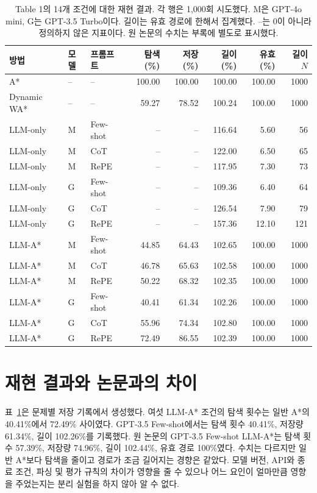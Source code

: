 \documentclass[11pt]{article}
\begin{document}
\begin{table}[t]
\centering\small
\begin{tabular}{lllrrrrr}
\toprule
방법 & 모델 & 프롬프트 & 탐색(\%) & 저장(\%) & 길이(\%) & 유효(\%) & 길이 $N$\\
\midrule
A* & -- & -- & 100.00 & 100.00 & 100.00 & 100.00 & 1000 \\
Dynamic WA* & -- & -- & 59.27 & 78.52 & 100.24 & 100.00 & 1000 \\
LLM-only & M & Few-shot & -- & -- & 116.64 & 5.60 & 56 \\
LLM-only & M & CoT & -- & -- & 122.00 & 6.50 & 65 \\
LLM-only & M & RePE & -- & -- & 117.95 & 7.30 & 73 \\
LLM-only & G & Few-shot & -- & -- & 109.36 & 6.40 & 64 \\
LLM-only & G & CoT & -- & -- & 126.54 & 7.90 & 79 \\
LLM-only & G & RePE & -- & -- & 157.36 & 12.10 & 121 \\
LLM-A* & M & Few-shot & 44.85 & 64.43 & 102.65 & 100.00 & 1000 \\
LLM-A* & M & CoT & 46.78 & 65.63 & 102.58 & 100.00 & 1000 \\
LLM-A* & M & RePE & 50.22 & 68.32 & 102.35 & 100.00 & 1000 \\
LLM-A* & G & Few-shot & 40.41 & 61.34 & 102.26 & 100.00 & 1000 \\
LLM-A* & G & CoT & 55.96 & 74.34 & 102.80 & 100.00 & 1000 \\
LLM-A* & G & RePE & 72.49 & 86.55 & 102.39 & 100.00 & 1000 \\
\bottomrule
\end{tabular}
\caption{Table 1의 14개 조건에 대한 재현 결과. 각 행은 1,000회 시도했다. M은 GPT-4o mini, G는 GPT-3.5 Turbo이다. 길이는 유효 경로에 한해서 집계했다. --는 0이 아니라 정의하지 않은 지표이다. 원 논문의 수치는 부록에 별도로 표시했다.}
\label{tab:reproduction}
\end{table}

\section{재현 결과와 논문과의 차이}
표~\ref{tab:reproduction}은 문제별 저장 기록에서 생성했다. 여섯 LLM-A* 조건의 탐색 횟수는 일반 A*의 40.41\%에서 72.49\% 사이였다. GPT-3.5 Few-shot에서는 탐색 횟수 40.41\%, 저장량 61.34\%, 길이 102.26\%를 기록했다. 원 논문의 GPT-3.5 Few-shot LLM-A*는 탐색 횟수 57.39\%, 저장량 74.96\%, 길이 102.44\%, 유효 경로 100\%였다. 수치는 다르지만 일반 A*보다 탐색을 줄이고 경로가 조금 길어지는 경향은 같았다. 모델 버전, API와 종료 조건, 파싱 및 평가 규칙의 차이가 영향을 줄 수 있으나 어느 요인이 얼마만큼 영향을 주었는지는 분리 실험을 하지 않아 알 수 없다.
\end{document}
